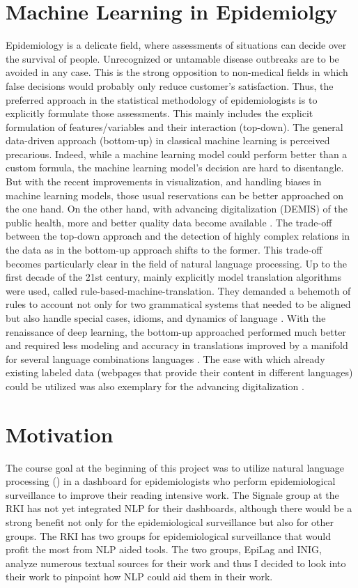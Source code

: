 \section{Machine Learning in Epidemiolgy}
Epidemiology is a delicate field, where assessments of situations can decide over the survival of people. Unrecognized or untamable disease outbreaks are to be avoided in any case. This is the strong opposition to non-medical fields in which false decisions would probably only reduce customer's satisfaction. Thus, the preferred approach in the statistical methodology of epidemiologists is to explicitly formulate those assessments. This mainly includes the explicit formulation of features/variables and their interaction (top-down). The general data-driven approach (bottom-up) in classical machine learning is perceived precarious. Indeed, while a machine learning model could perform better than a custom formula, the machine learning model's decision are hard to disentangle. But with the recent improvements in visualization, and handling biases in machine learning models, those usual reservations can be better approached on the one hand. On the other hand, with advancing digitalization (DEMIS) of the public health, more and better quality data become available \citep{DEMIS}. The trade-off between the top-down approach and the detection of highly complex relations in the data as in the bottom-up approach shifts to the former. This trade-off becomes particularly clear in the field of natural language processing. Up to the first decade of the 21st century, mainly explicitly model translation algorithms were used, called rule-based-machine-translation. They demanded a behemoth of rules to account not only for two grammatical systems that needed to be aligned but also handle special cases, idioms, and dynamics of language \citep{Bar-Hillel1953, Bar-Hillel1960}. With the renaissance of deep learning, the bottom-up approached performed much better and required less modeling and accuracy in translations improved by a manifold for several language combinations languages \citep{Bengio2003}. The ease with which already existing labeled data (webpages that provide their content in different languages) could be utilized was also exemplary for the advancing digitalization \citep{Macklovitch00}.



\section{Motivation}
The course goal at the beginning of this project was to utilize natural language
processing () in a dashboard for epidemiologists who perform epidemiological
surveillance to improve their reading intensive work.
The Signale group at the RKI has not yet integrated NLP for their dashboards, although there would be a strong benefit not only for the epidemiological surveillance but also for other groups. The RKI has two groups for epidemiological surveillance that would profit the most from NLP aided tools. The two groups, EpiLag and INIG, analyze numerous textual sources for their work and thus I decided to look into their work to pinpoint how NLP could aid them in their work.

